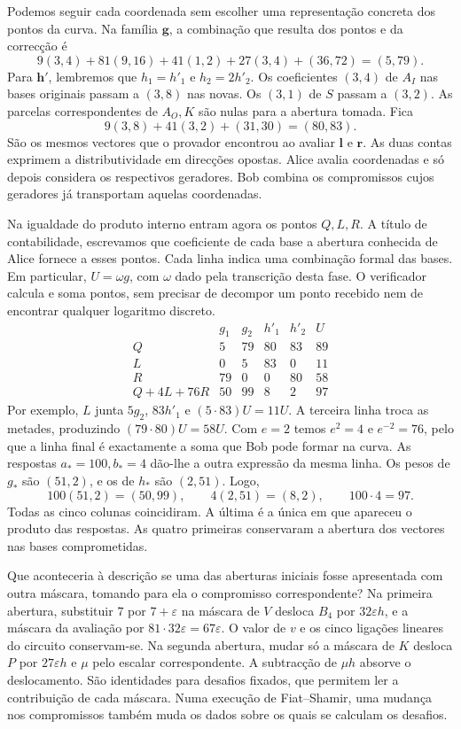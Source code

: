 Podemos seguir cada coordenada sem escolher uma representação
concreta dos pontos da curva. Na família \(\boldsymbol g\), a
combinação que resulta dos pontos e da correcção é
\[
 9(3,4)+81(9,16)+41(1,2)+27(3,4)+(36,72)=(5,79).
\]
Para \(\boldsymbol h'\), lembremos que
\(h_1=h'_1\) e \(h_2=2h'_2\). Os coeficientes \((3,4)\) de
\(A_I\) nas bases originais passam a \((3,8)\) nas novas. Os
\((3,1)\) de \(S\) passam a \((3,2)\). As parcelas correspondentes
de \(A_O,K\) são nulas para a abertura tomada. Fica
\[
        9(3,8)+41(3,2)+(31,30)=(80,83).
\]
São os mesmos vectores que o provador encontrou ao avaliar
\(\boldsymbol l\) e \(\boldsymbol r\). As duas contas exprimem a
distributividade em direcções opostas. Alice avalia coordenadas
e só depois considera os respectivos geradores. Bob combina os
compromissos cujos geradores já transportam aquelas coordenadas.

Na igualdade do produto interno entram agora os pontos \(Q,L,R\).
A título de contabilidade, escrevamos que coeficiente de cada base
a abertura conhecida de Alice fornece a esses pontos. Cada linha
indica uma combinação formal das bases. Em particular,
\(U=\omega g\), com \(\omega\) dado pela transcrição desta fase.
O verificador calcula e soma pontos, sem precisar de decompor um
ponto recebido nem de encontrar qualquer logaritmo discreto.
\[
\begin{array}{c|rrrrr}
       &g_1&g_2&h'_1&h'_2&U\\ \hline
 Q     &5&79&80&83&89\\
 L     &0&5&83&0&11\\
 R     &79&0&0&80&58\\ \hline
 Q+4L+76R&50&99&8&2&97
\end{array}
\]
Por exemplo, \(L\) junta \(5g_2\), \(83h'_1\) e
\((5\cdot83)U=11U\). A terceira linha troca as metades,
produzindo \((79\cdot80)U=58U\). Com \(e=2\) temos \(e^2=4\)
e \(e^{-2}=76\), pelo que a linha final é exactamente a soma que
Bob pode formar na curva. As respostas \(a_*=100,b_*=4\) dão-lhe
a outra expressão da mesma linha. Os pesos de \(g_*\) são
\((51,2)\), e os de \(h_*\) são \((2,51)\). Logo,
\[
 100(51,2)=(50,99),\qquad 4(2,51)=(8,2),\qquad
 100\cdot4=97 .
\]
Todas as cinco colunas coincidiram. A última é a única em que
apareceu o produto das respostas. As quatro primeiras conservaram
a abertura dos vectores nas bases comprometidas.

Que aconteceria à descrição se uma das aberturas iniciais fosse
apresentada com outra máscara, tomando para ela o compromisso
correspondente? Na primeira abertura, substituir \(7\) por
\(7+\varepsilon\) na máscara de \(V\) desloca \(B_4\) por
\(32\varepsilon h\), e a máscara da avaliação por
\(81\cdot32\varepsilon=67\varepsilon\). O valor de \(v\) e os
cinco ligações lineares do circuito conservam-se. Na segunda
abertura, mudar só a máscara de \(K\) desloca \(P\) por
\(27\varepsilon h\) e \(\mu\) pelo escalar correspondente.
A subtracção de \(\mu h\) absorve o deslocamento. São identidades
para desafios fixados, que permitem ler a contribuição de cada
máscara. Numa execução de Fiat--Shamir, uma mudança nos compromissos
também muda os dados sobre os quais se calculam os desafios.

